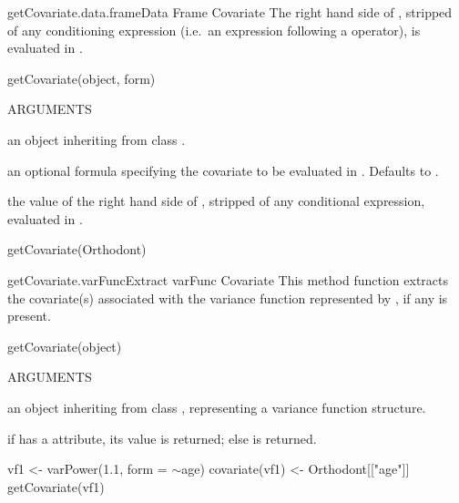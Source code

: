\documentclass[pdftex]{article} \usepackage{url,graphicx}
\renewcommand{\Twiddle}{\mbox{\(\sim\)}}
\begin{document}
\begin{Helpfile}{getCovariate.data.frame}{Data Frame Covariate}
The right hand side of , stripped of any conditioning
expression (i.e.\ an expression following a \Co{|} operator), is
evaluated in .
\begin{Example}
getCovariate(object, form)
\end{Example}
\begin{Argument}{ARGUMENTS}
\item[\Co{object:}]
an object inheriting from class .
\item[\Co{form:}]
an optional formula specifying the covariate to be
evaluated in . Defaults to .
\end{Argument}
the value of the right hand side of , stripped of
any conditional expression, evaluated in .
\need 15pt
\vspace{-16pt} 
\begin{Example}
getCovariate(Orthodont)
\end{Example}
\end{Helpfile}
\begin{Helpfile}{getCovariate.varFunc}{Extract varFunc Covariate}
This method function extracts the covariate(s) associated with the
variance function represented by , if any is present.
\begin{Example}
getCovariate(object)
\end{Example}
\begin{Argument}{ARGUMENTS}
\item[\Co{object:}]
an object inheriting from class ,
representing a variance function structure.
\end{Argument}
if  has a  attribute, its value is
returned; else  is returned.
\need 15pt
\vspace{-16pt} 
\begin{Example}
vf1 <- varPower(1.1, form = \Twiddle age)
covariate(vf1) <- Orthodont[["age"]]
getCovariate(vf1)
\end{Example}
\end{Helpfile}
\end{document}
